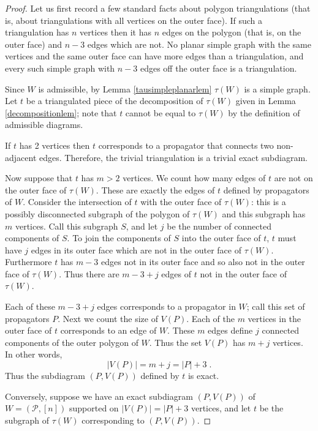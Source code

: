 \documentclass[11pt]{article}
\newcommand{\cP}{\mathcal{P}}
\theoremstyle{remark}
\theoremstyle{definition}
\begin{document}
\begin{proof}
Let us first record a few standard facts about polygon triangulations (that is, about triangulations with all vertices on the outer face).  If such a triangulation has $n$ vertices then it has $n$ edges on the polygon (that is, on the outer face) and $n-3$ edges which are not.  No planar simple graph with the same vertices and the same outer face can have more edges than a triangulation, and every such simple graph with $n-3$ edges off the outer face is a triangulation.

Since $W$ is admissible, by Lemma \ref{tausimpleplanarlem} $\tau(W)$ is a simple graph. Let $t$ be a triangulated piece of the decomposition of $\tau(W)$ given in Lemma \ref{decompositionlem}; note that $t$ cannot be equal to $\tau(W)$ by the definition of admissible diagrams.

If $t$ has 2 vertices then $t$ corresponds to a propagator that connects two non-adjacent edges. Therefore, the trivial triangulation is a trivial exact subdiagram.

Now suppose that $t$ has $m>2$ vertices.  We count how many edges of $t$ are not on the outer face of $\tau(W)$.  These are exactly the edges of $t$ defined by propagators of $W$. Consider the intersection of $t$ with the outer face of $\tau(W)$: this is a possibly disconnected subgraph of the polygon of $\tau(W)$ and this subgraph has $m$ vertices. Call this subgraph $S$, and let $j$ be the number of connected components of $S$.   To join the components of $S$ into the outer face of $t$, $t$ must have $j$ edges in its outer face which are not in the outer face of $\tau(W)$.  Furthermore $t$ has $m-3$ edges not in its outer face and so also not in the outer face of $\tau(W)$.  Thus there are $m-3+j$ edges of $t$ not in the outer face of $\tau(W)$.

Each of these $m-3+j$ edges corresponds to a propagator in $W$; call this set of propagators $P$.  Next we count the size of $V(P)$.  Each of the $m$ vertices in the outer face of $t$ corresponds to an edge of $W$. These $m$ edges define $j$ connected components of the outer polygon of $W$. Thus the set $V(P)$ has $m+j$ vertices.  In other words, 
\[|V(P)| = m+j = |P| +3\;.\]
Thus the subdiagram $(P,V(P))$ defined by $t$ is exact.


Conversely, suppose we have an exact subdiagram $(P, V(P))$ of $W = (\cP, [n])$ supported on $|V(P)| = |P|+3$ vertices, and let $t$ be the subgraph of $\tau(W)$ corresponding to $(P,V(P))$.


\end{proof}
\end{document}
